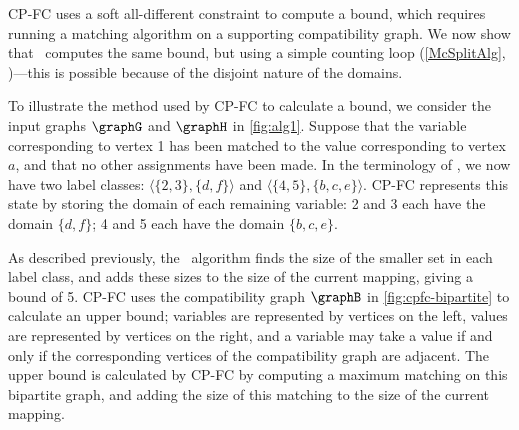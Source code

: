 CP-FC uses a soft all-different constraint to compute a bound, which requires
running a matching algorithm on a supporting compatibility graph.  We now
show that \McSplit\ computes the same bound, but using a simple
counting loop (\cref{McSplitAlg}, )---this is possible
because of the disjoint nature of the domains.

To illustrate the method used by CP-FC to calculate a bound, we consider the
input graphs $\graphG$ and $\graphH$ in \cref{fig:alg1}. Suppose that the
variable corresponding to vertex 1 has been matched to the value corresponding
to vertex $a$, and that no other assignments have been made.  In the
terminology of \McSplit, we now have two label classes: $\langle \{2,3\},
\{d,f\} \rangle$ and $\langle \{4,5\}, \{b,c,e\} \rangle$.  CP-FC represents
this state by storing the domain of each remaining variable: 2 and 3 each
have the domain $\{d,f\}$; 4 and 5 each have the domain $\{b,c,e\}$.

As described previously, the \McSplit\ algorithm finds the size of the smaller
set in each label class, and adds these sizes to the size of the current
mapping, giving a bound of 5.  CP-FC uses the compatibility graph $\graphB$ in
\cref{fig:cpfc-bipartite} to calculate an upper bound; variables are
represented by vertices on the left, values are represented by vertices on the
right, and a variable may take a value if and only if the corresponding
vertices of the compatibility graph are adjacent.  The upper bound is
calculated by CP-FC by computing a maximum matching on this bipartite graph,
and adding the size of this matching to the size of the current mapping.

